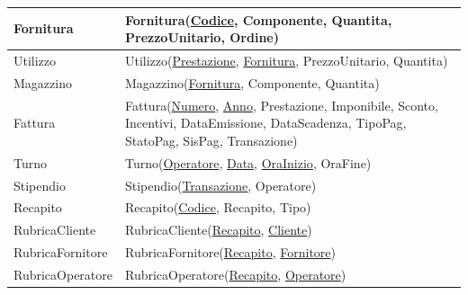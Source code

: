 \begin{longtable}{| p{3cm} | p{11.5cm} |}
				\hline
			Fornitura & 
				Fornitura(\underline{Codice}, Componente, Quantita, PrezzoUnitario, Ordine) \\
				\hline
			Utilizzo &
				Utilizzo(\underline{Prestazione}, \underline{Fornitura}, PrezzoUnitario, Quantita) \\
				\hline
			Magazzino &
				Magazzino(\underline{Fornitura}, Componente,  Quantita) \\
				\hline
			Fattura &
				Fattura(\underline{Numero}, \underline{Anno}, Prestazione, Imponibile, Sconto, Incentivi, DataEmissione, DataScadenza, TipoPag, StatoPag, SisPag, Transazione) \\
				\hline
			Turno & 
				Turno(\underline{Operatore}, \underline{Data}, \underline{OraInizio}, OraFine) \\
				\hline
			Stipendio &
				Stipendio(\underline{Transazione}, Operatore) \\
				\hline
			Recapito &
				Recapito(\underline{Codice}, Recapito, Tipo) \\
				\hline
			RubricaCliente &
				RubricaCliente(\underline{Recapito}, \underline{Cliente}) \\
				\hline
			RubricaFornitore &
				RubricaFornitore(\underline{Recapito}, \underline{Fornitore}) \\
				\hline
			RubricaOperatore &
				RubricaOperatore(\underline{Recapito}, \underline{Operatore}) \\
				\hline

		\end{longtable}
	\vspace{2ex}

